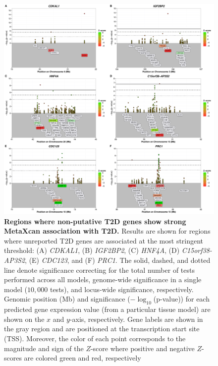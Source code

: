 \documentclass[10pt]{article}
\begin{document}
\begin{figure}
	\includegraphics[width=\textwidth]{fig3_locusArray.pdf}
	\caption{\textbf{Regions where non-putative T2D genes show strong MetaXcan association with T2D.} Results are shown for regions where unreported T2D genes are associated at the most stringent threshold: (A) \textit{CDKAL1}, (B) \textit{IGF2BP2}, (C) \textit{HNF4A}, (D) \textit{C15orf38-AP3S2}, (E) \textit{CDC123}, and (F) \textit{PRC1}. The solid, dashed, and dotted line denote significance correcting for the total number of tests performed across all models, genome-wide significance in a single model ($10,000$ tests), and locus-wide significance, respectively. Genomic position (Mb) and significance ($-\log_{10}$(p-value)) for each predicted gene expression value (from a particular tissue model) are shown on the $x$ and $y$-axis, respectively. Gene labels are shown in the gray region and are positioned at the transcription start site (TSS). Moreover, the color of each point corresponds to the magnitude and sign of the $Z$-score where positive and negative $Z$-scores are colored green and red, respectively}
    \label{fig:locus_array_3}
\end{figure}
\end{document}
